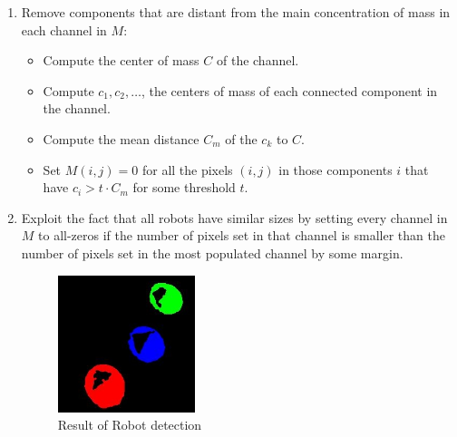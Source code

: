 \documentclass[10pt,a4paper]{article}
\begin{document}
\begin{enumerate}
    \item
    Remove components that are distant from the main concentration of mass in
    each channel in $M$:
    \begin{itemize}
        \item
        Compute the center of mass $C$ of the channel.
        \item
        Compute $c_1, c_2, \ldots$, the centers of mass of each connected 
        component in the channel.
        \item
        Compute the mean distance $C_m$ of the $c_k$ to $C$.
        \item
        Set $M(i,j) = 0$ for all the pixels $(i,j)$ in those components $i$ that
        have $c_i > t \cdot C_m$ for some threshold $t$.
    \end{itemize}

    \item
    Exploit the fact that all robots have similar sizes by setting every channel
    in $M$ to all-zeros if the number of pixels set in that channel is smaller
    than the number of pixels set in the most populated channel by some margin.

    \begin{figure}[h]
        \centering
        \includegraphics[width=40mm]{d1_i5_blob_mask.jpg}
        \caption{Result of Robot detection}
    \end{figure} 
\end{enumerate} 
\end{document}
